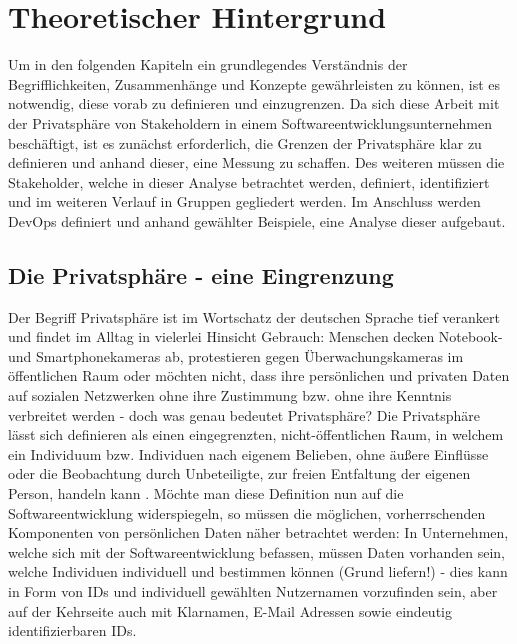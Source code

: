 \chapter{Theoretischer Hintergrund} %
\label{Background} %
Um in den folgenden Kapiteln ein grundlegendes Verständnis der Begrifflichkeiten, Zusammenhänge und Konzepte gewährleisten zu können, ist es notwendig,
diese vorab zu definieren und einzugrenzen. Da sich diese Arbeit mit der Privatsphäre von Stakeholdern in einem Softwareentwicklungsunternehmen beschäftigt,
ist es zunächst erforderlich, die Grenzen der Privatsphäre klar zu definieren und anhand dieser, eine Messung zu schaffen. Des weiteren müssen die Stakeholder,
welche in dieser Analyse betrachtet werden, definiert, identifiziert und im weiteren Verlauf in Gruppen gegliedert werden. Im Anschluss werden DevOps definiert und anhand
gewählter Beispiele, eine Analyse dieser aufgebaut.

\section{Die Privatsphäre - eine Eingrenzung}
Der Begriff Privatsphäre ist im Wortschatz der deutschen Sprache tief verankert und findet im Alltag in vielerlei Hinsicht Gebrauch: Menschen decken Notebook- und Smartphonekameras
ab, protestieren gegen Überwachungskameras im öffentlichen Raum \cite{Stallwood:2013aa} oder möchten nicht, dass ihre persönlichen und privaten Daten auf sozialen Netzwerken ohne ihre Zustimmung
bzw. ohne ihre Kenntnis verbreitet werden \cite{Picchi:2018aa} - doch was genau bedeutet Privatsphäre? \newline
Die Privatsphäre lässt sich definieren als einen eingegrenzten, nicht-öffentlichen Raum, in welchem ein Individuum bzw. Individuen nach eigenem Belieben, ohne äußere Einflüsse oder die Beobachtung durch
Unbeteiligte, zur freien Entfaltung der eigenen Person, handeln kann \cite*{Pettinger:2020aa}. Möchte man diese Definition nun auf die Softwareentwicklung widerspiegeln, so müssen die möglichen, 
vorherrschenden Komponenten von persönlichen Daten näher betrachtet werden: In Unternehmen, welche sich mit der Softwareentwicklung befassen, müssen Daten vorhanden sein, welche Individuen individuell und 
bestimmen können (Grund liefern!) - dies kann in Form von IDs und individuell gewählten Nutzernamen vorzufinden sein, aber auf der Kehrseite auch mit Klarnamen, E-Mail Adressen sowie eindeutig identifizierbaren IDs. 

